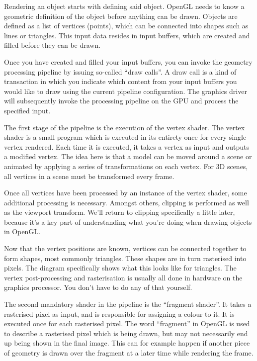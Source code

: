 Rendering an object starts with defining said object. OpenGL needs to know a geometric definition of the object before anything can be drawn. Objects are defined as a list of vertices (points), which can be connected into shapes such as lines or triangles. This input data resides in input buffers, which are created and filled before they can be drawn.

Once you have created and filled your input buffers, you can invoke the geometry processing pipeline by issuing so-called ``draw calls''. A draw call is a kind of transaction in which you indicate which content from your input buffers you would like to draw using the current pipeline configuration. The graphics driver will subsequently invoke the processing pipeline on the GPU and process the specified input.

The first stage of the pipeline is the execution of the vertex shader. The vertex shader is a small program which is executed in its entirety once for every single vertex rendered. Each time it is executed, it takes a vertex as input and outputs a modified vertex. The idea here is that a model can be moved around a scene or animated by applying a series of transformations on each vertex. For 3D scenes, all vertices in a scene must be transformed every frame.

Once all vertices have been processed by an instance of the vertex shader, some additional processing is necessary. Amongst others, clipping is performed as well as the viewport transform. We'll return to clipping specifically a little later, because it's a key part of understanding what you're doing when drawing objects in OpenGL.

Now that the vertex positions are known, vertices can be connected together to form shapes, most commonly triangles. These shapes are in turn rasterised into pixels. The diagram specifically shows what this looks like for triangles. The vertex post-processing and rasterisation is usually all done in hardware on the graphics processor. You don't have to do any of that yourself.

The second mandatory shader in the pipeline is the ``fragment shader''. It takes a rasterised pixel as input, and is responsible for assigning a colour to it. It is executed once for each rasterised pixel. The word ``fragment'' in OpenGL is used to describe a rasterised pixel which is being drawn, but may not necessarily end up being shown in the final image. This can for example happen if another piece of geometry is drawn over the fragment at a later time while rendering the frame. 

